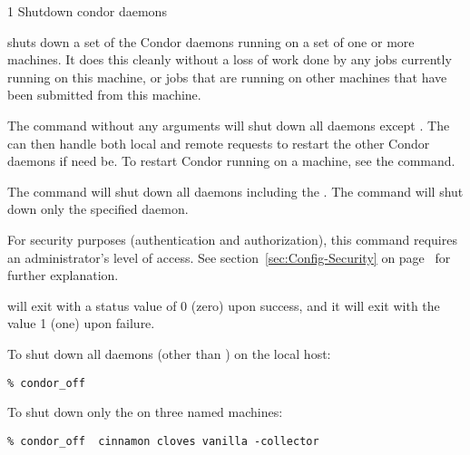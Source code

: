 \begin{ManPage}{\label{man-condor-off}}{1}
{Shutdown condor daemons}
\Synopsis {}
\ToolArgsBase

\ToolDebugOption
\ToolArgsLocate
\ToolArgsAffect

\ToolDebugOption
\ToolWhere
\ToolArgsAffect


\Description 

 shuts down a set of the Condor daemons running on a set of
one or more machines.
It does this cleanly without a loss of work done by any jobs
currently running on this machine, or jobs that are running on other machines
that have been submitted from this machine.

The command  without any arguments will shut down
all daemons except .
The  can then handle both local and remote
requests to restart the other Condor daemons if need be.  To restart
Condor running on a machine, see the  command.

The command  will shut down
all daemons including the .
The command  will shut down
only the specified daemon.

For security purposes (authentication and authorization),
this command requires an administrator's level of access.
See
section~\ref{sec:Config-Security} on page~\pageref{sec:Config-Security}
for further explanation.

\begin{Options}
	\ToolArgsBaseDesc
	\ToolDebugDesc
	\ToolArgsLocateDesc
	\ToolArgsAffectDesc
\end{Options}

\ExitStatus
{} will exit with a status value of 0 (zero) upon success,
and it will exit with the value 1 (one) upon failure.


\Examples
To shut down all daemons (other than ) on the
local host:
\begin{verbatim}
% condor_off
\end{verbatim}

To shut down only the  on three named machines:
\begin{verbatim}
% condor_off  cinnamon cloves vanilla -collector
\end{verbatim}


\end{ManPage}
